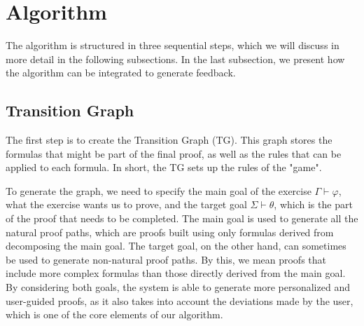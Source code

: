 \section{Algorithm}
The algorithm is structured in three sequential steps, which we will discuss in more detail in the following subsections. In the last subsection, we present how the algorithm can be integrated to generate feedback.


\subsection{Transition Graph}
The first step is to create the Transition Graph (TG). This graph stores the formulas that might be part of the final proof, as well as the rules that can be applied to each formula. In short, the TG sets up the rules of the "game".

To generate the graph, we need to specify the main goal of the exercise \(\Gamma \vdash \varphi\), what the exercise wants us to prove, and the target goal \(\Sigma \vdash \theta\), which is the part of the proof that needs to be completed. The main goal is used to generate all the natural proof paths, which are proofs built using only formulas derived from decomposing the main goal. The target goal, on the other hand, can sometimes be used to generate non-natural proof paths. By this, we mean proofs that include more complex formulas than those directly derived from the main goal. By considering both goals, the system is able to generate more personalized and user-guided proofs, as it also takes into account the deviations made by the user, which is one of the core elements of our algorithm.

